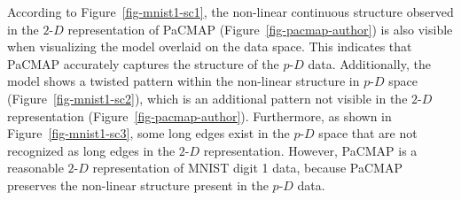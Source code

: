 \documentclass[
  12pt]{article}
\newcommand\pD{$p\text{-}D$}
\newcommand\gD{$2\text{-}D$}
\begin{document}
According to Figure~\ref{fig-mnist1-sc1}, the non-linear continuous
structure observed in the \gD{} representation of PaCMAP
(Figure~\ref{fig-pacmap-author}) is also visible when visualizing the
model overlaid on the data space. This indicates that PaCMAP accurately
captures the structure of the \pD{} data. Additionally, the model shows
a twisted pattern within the non-linear structure in \pD{} space
(Figure~\ref{fig-mnist1-sc2}), which is an additional pattern not
visible in the \gD{} representation (Figure~\ref{fig-pacmap-author}).
Furthermore, as shown in Figure~\ref{fig-mnist1-sc3}, some long edges
exist in the \pD{} space that are not recognized as long edges in the
\gD{} representation. However, PaCMAP is a reasonable \gD{}
representation of MNIST digit 1 data, because PaCMAP preserves the
non-linear structure present in the \pD{} data.
\end{document}
